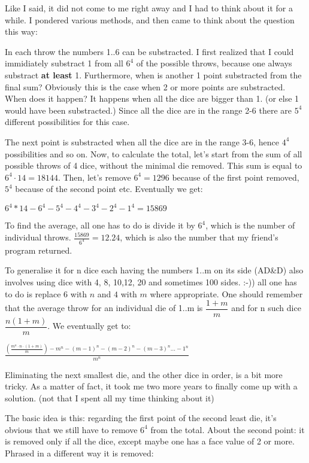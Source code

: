 \documentclass[a4paper]{article}
\begin{document}
Like I said, it did not come to me right away and I had to think about it
for a while. I pondered various methods, and then came to think about the
question this way:

In each throw the numbers 1..6 can be substracted. I first realized that I
could immidiately substract 1 from all $ 6^4 $ of the possible throws, because
one always substract {\bf at least} 1. Furthermore, when is another 1 point
substracted from the final sum? Obviously this is the case when 2 or more
points are substracted. When does it happen? It happens when all the dice
are bigger than 1. (or else 1 would have been substracted.) Since all the
dice are in the range 2-6 there are $5^4$ different possibilities for this
case.

The next point is substracted when all the dice are in the range 3-6, hence
$4^4$ possibilities and so on. Now, to calculate the total, let's start from
the sum of all possible throws of 4 dice, without the minimal die removed.
This sum is equal to $6^4 \cdot 14 = 18144$. Then, let's remove $6^4 = 1296$ 
because of the first point removed, $5^4$ because of the second point etc. 
Eventually we get:

$6^4 * 14 - 6^4 - 5^4 - 4^4 - 3^4 - 2^4 - 1^4 = 15869$

To find the average, all one has to do is divide it by $6^4$, which is the
number of individual throws. $\frac{15869}{6^4} = 12.24$, which is also the 
number that my friend's program returned.

To generalise it for n dice each having the numbers 1..m on its side 
(AD\&D) also involves using dice with 4, 8, 10,12, 20 and sometimes 100 
sides. :-)) all one has to do is replace $6$ with $n$ and $4$ with $m$
where  appropriate. One should remember that the average throw for an
individual die of 1..m is $\dfrac{1+m}{m} $ and for n such dice 
$\dfrac{n\left(1+m\right)}{m}$. We eventually get to:

$
\frac{\left( \frac{m^n \cdot n \cdot \left(1+m\right)}{m} \right) - m^n - 
\left(m-1\right)^n - \left(m-2\right)^n - \left(m-3\right)^n ... - 1^n}{m ^ n}
$

Eliminating the next smallest die, and the other dice in order, is a bit
more tricky. As a matter of fact, it took me two more years to finally come
up with a solution. (not that I spent all my time thinking about it)

The basic idea is this: regarding the first point of the second least die,
it's obvious that we still have to remove $6^4$ from the total. About the
second point: it is removed only if all the dice, except maybe one has a
face value of 2 or more. Phrased in a different way it is removed:
\end{document}
